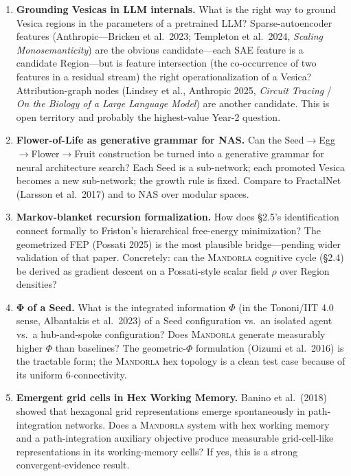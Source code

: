 \documentclass[11pt,a4paper]{article}
\begin{document}
\begin{enumerate}[leftmargin=*]
  \item \textbf{Grounding Vesicas in LLM internals.} What is the right way to ground Vesica regions in the parameters of a pretrained LLM? Sparse-autoencoder features (Anthropic---Bricken et al.\ 2023; Templeton et al.\ 2024, \emph{Scaling Monosemanticity}) are the obvious candidate---each SAE feature is a candidate Region---but is feature intersection (the co-occurrence of two features in a residual stream) the right operationalization of a Vesica? Attribution-graph nodes (Lindsey et al., Anthropic 2025, \emph{Circuit Tracing} / \emph{On the Biology of a Large Language Model}) are another candidate. This is open territory and probably the highest-value Year-2 question.
  \item \textbf{Flower-of-Life as generative grammar for NAS.} Can the Seed$\rightarrow$Egg$\rightarrow$Flower$\rightarrow$Fruit construction be turned into a generative grammar for neural architecture search? Each Seed is a sub-network; each promoted Vesica becomes a new sub-network; the growth rule is fixed. Compare to FractalNet (Larsson et al.\ 2017) and to NAS over modular spaces.
  \item \textbf{Markov-blanket recursion formalization.} How does \S 2.5's identification connect formally to Friston's hierarchical free-energy minimization? The geometrized FEP (Possati 2025) is the most plausible bridge---pending wider validation of that paper. Concretely: can the \textsc{Mandorla} cognitive cycle (\S 2.4) be derived as gradient descent on a Possati-style scalar field $\rho$ over Region densities?
  \item $\boldsymbol{\Phi}$ \textbf{of a Seed.} What is the integrated information $\Phi$ (in the Tononi/IIT 4.0 sense, Albantakis et al.\ 2023) of a Seed configuration vs.\ an isolated agent vs.\ a hub-and-spoke configuration? Does \textsc{Mandorla} generate measurably higher $\Phi$ than baselines? The geometric-$\Phi$ formulation (Oizumi et al.\ 2016) is the tractable form; the \textsc{Mandorla} hex topology is a clean test case because of its uniform 6-connectivity.
  \item \textbf{Emergent grid cells in Hex Working Memory.} Banino et al.\ (2018) showed that hexagonal grid representations emerge spontaneously in path-integration networks. Does a \textsc{Mandorla} system with hex working memory and a path-integration auxiliary objective produce measurable grid-cell-like representations in its working-memory cells? If yes, this is a strong convergent-evidence result.

\end{enumerate}
\end{document}
